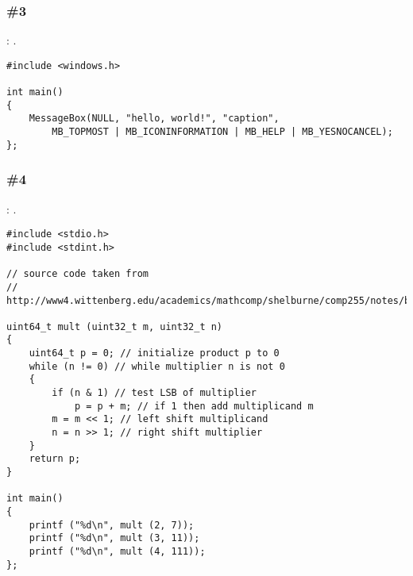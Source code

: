 \subsubsection{\Exercise \#3}
\label{exercise_solutions_bitfields_3}

\Exercise: .

\begin{lstlisting}
#include <windows.h>

int main()
{
	MessageBox(NULL, "hello, world!", "caption", 
		MB_TOPMOST | MB_ICONINFORMATION | MB_HELP | MB_YESNOCANCEL);
};
\end{lstlisting}

\subsubsection{\Exercise \#4}
\label{exercise_solutions_bitfields_4}

\Exercise: .


\begin{lstlisting}
#include <stdio.h>
#include <stdint.h>

// source code taken from
// http://www4.wittenberg.edu/academics/mathcomp/shelburne/comp255/notes/binarymultiplication.pdf

uint64_t mult (uint32_t m, uint32_t n)
{
    uint64_t p = 0; // initialize product p to 0 
    while (n != 0) // while multiplier n is not 0 
    { 
        if (n & 1) // test LSB of multiplier 
            p = p + m; // if 1 then add multiplicand m 
        m = m << 1; // left shift multiplicand 
        n = n >> 1; // right shift multiplier 
    }
    return p;
}

int main()
{
    printf ("%d\n", mult (2, 7));
    printf ("%d\n", mult (3, 11));
    printf ("%d\n", mult (4, 111));
};
\end{lstlisting}

\subsection{}

